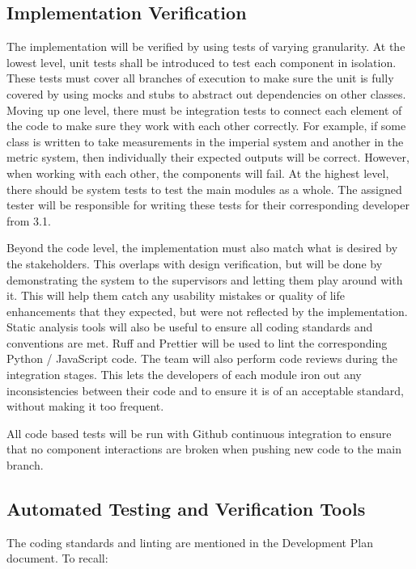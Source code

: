 \documentclass[12pt, titlepage]{article}
\begin{document}
\subsection{Implementation Verification}

The implementation will be verified by using tests of varying granularity. At 
the lowest level, unit tests shall be introduced to test each component in 
isolation. These tests must cover all branches of execution to make sure the 
unit is fully covered by using mocks and stubs to abstract out dependencies 
on other classes. Moving up one level, there must be integration tests to 
connect each element of the code to make sure they work with each other 
correctly. For example, if some class is written to take measurements in the 
imperial system and another in the metric system, then individually their 
expected outputs will be correct. However, when working with each other, the 
components will fail. At the highest level, there should be system tests to 
test the main modules as a whole. The assigned tester will be responsible for 
writing these tests for their corresponding developer from 3.1. 

Beyond the code level, the implementation must also match what is desired by 
the stakeholders. This overlaps with design verification, but will be done by 
demonstrating the system to the supervisors and letting them play around with 
it. This will help them catch any usability mistakes or quality of life 
enhancements that they expected, but were not reflected by the implementation. 
Static analysis tools will also be useful to ensure all coding standards and 
conventions are met. Ruff and Prettier will be used to lint the corresponding 
Python / JavaScript code. The team will also perform code reviews during the 
integration stages. This lets the developers of each module iron out any 
inconsistencies between their code and to ensure it is of an acceptable 
standard, without making it too frequent. 

All code based tests will be run with Github continuous integration to ensure 
that no component interactions are broken when pushing new code to the main 
branch.

\subsection{Automated Testing and Verification Tools}

The coding standards and linting are mentioned in the Development Plan document. 
To recall:
\end{document}
